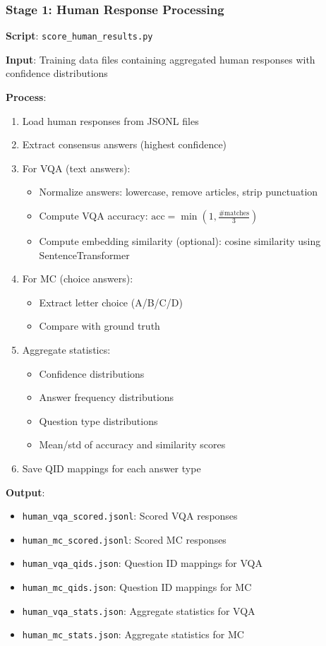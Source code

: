 \documentclass{article}
\begin{document}
\subsubsection{Stage 1: Human Response Processing}

\textbf{Script}: \texttt{score\_human\_results.py}

\textbf{Input}: Training data files containing aggregated human responses with confidence distributions

\textbf{Process}:
\begin{enumerate}
    \item Load human responses from JSONL files
    \item Extract consensus answers (highest confidence)
    \item For VQA (text answers):
    \begin{itemize}
        \item Normalize answers: lowercase, remove articles, strip punctuation
        \item Compute VQA accuracy: $\text{acc} = \min(1, \frac{\text{\# matches}}{3})$
        \item Compute embedding similarity (optional): cosine similarity using SentenceTransformer
    \end{itemize}
    \item For MC (choice answers):
    \begin{itemize}
        \item Extract letter choice (A/B/C/D)
        \item Compare with ground truth
    \end{itemize}
    \item Aggregate statistics:
    \begin{itemize}
        \item Confidence distributions
        \item Answer frequency distributions
        \item Question type distributions
        \item Mean/std of accuracy and similarity scores
    \end{itemize}
    \item Save QID mappings for each answer type
\end{enumerate}

\textbf{Output}:
\begin{itemize}
    \item \texttt{human\_vqa\_scored.jsonl}: Scored VQA responses
    \item \texttt{human\_mc\_scored.jsonl}: Scored MC responses
    \item \texttt{human\_vqa\_qids.json}: Question ID mappings for VQA
    \item \texttt{human\_mc\_qids.json}: Question ID mappings for MC
    \item \texttt{human\_vqa\_stats.json}: Aggregate statistics for VQA
    \item \texttt{human\_mc\_stats.json}: Aggregate statistics for MC
\end{itemize}
\end{document}
